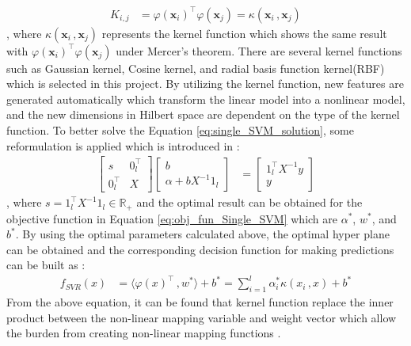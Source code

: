 \begin{align}
    K_{i,j} &= {\varphi(\mathbf{x}_i)}^{\intercal} {\varphi(\mathbf{x}_j)} 
    = \kappa({\mathbf{x}_i} \,, \mathbf{x}_j)
    \label{eq:SVM kernel func}
\end{align}
, where $\kappa({\mathbf{x}_i} \,, \mathbf{x}_j)$ represents the kernel function which shows the same result with ${\varphi(\mathbf{x}_i)}^{\intercal} {\varphi(\mathbf{x}_j)}$ under Mercer's theorem. There are several kernel functions such as Gaussian kernel, Cosine kernel, and radial basis function kernel(RBF) which is selected in this project. By utilizing the kernel function, new features are generated automatically which transform the linear model into a nonlinear model, and the new dimensions in Hilbert space are dependent on the type of the kernel function. To better solve the Equation \ref{eq:single_SVM_solution}, some reformulation is applied which is introduced in \cite{suykens2002least}:
\begin{align}
    \begin{bmatrix} s & 0_l^{\intercal} \\ 0_l^{\intercal} & X \end{bmatrix} 
    \begin{bmatrix} b \\ \alpha + b X^{-1} 1_l \end{bmatrix} &=
    \begin{bmatrix} 1_l^{\intercal} X^{-1} y   \\ y \end{bmatrix}
    \label{eq:single_SVM_solution_revised}
\end{align}
, where $s=1_l^{\intercal} X^{-1} 1_l \in \mathbb{R}_+ $ and the optimal result can be obtained for the objective function in Equation \ref{eq:obj_fun_Single_SVM} which are $\alpha^{*}$, $w^{*}$,  and $b^{*}$. By using the optimal parameters calculated above, the optimal hyper plane can be obtained and the corresponding decision function for making predictions can be built as \cite{xu2013multi}:
\begin{align}
    f_{SVR}(x) &=\langle \varphi (x) ^{\intercal}  \,,  w^{*} \rangle  + b^{*} = \sum_{i=1}^{l} \alpha_i^{*} 
                    \kappa({x_i} \,, x)+b^{*}
    \label{eq:single_SVM_pred}
\end{align}
From the above equation, it can be found that kernel function replace the inner product between the non-linear mapping variable and weight vector which allow the burden from creating non-linear mapping functions \cite{xu2013multi}.

